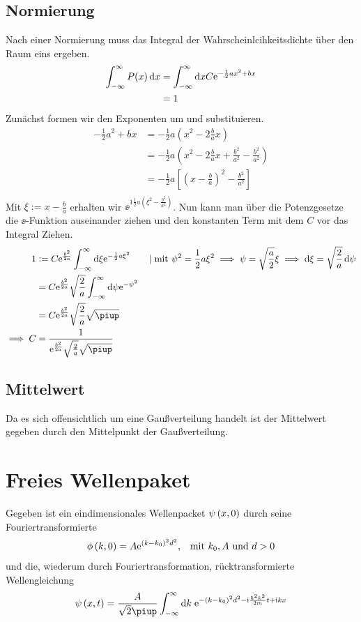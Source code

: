 \subsection{Normierung}
Nach einer Normierung muss das Integral der Wahrscheinlcihkeitsdichte über den Raum eins ergeben.
\begin{align*}
    \int^\infty_{-\infty} P(x)\dif x &= \int^\infty_{-\infty}\dif xC\ee^{-\frac 12ax^2+bx} \\
                                     &= 1 \\
\end{align*}
Zunächst formen wir den Exponenten um und substituieren.
\begin{align*}
    -\frac 12a^2+bx &= -\frac 12a(x^2-2\frac bax) \\
                    &= -\frac 12a(x^2-2\frac bax+\frac{b^2}{a^2}-\frac{b^2}{a^2}) \\
                    &= -\frac 12a[(x-\frac ba)^2-\frac{b^2}{a^2}] \\
\end{align*}
Mit $\xi := x-\frac ba$ erhalten wir $\ee^{1\frac 12 a(\xi^2-\frac{b^2}{a^2})}$.
Nun kann man über die Potenzgesetze die $\ee$-Funktion auseinander ziehen und den konstanten Term mit dem $C$ vor das Integral Ziehen.
\begin{align*}
    1&:= C\ee^{\frac{b^2}{2a}}\int^\infty_{-\infty}\dif\xi\ee^{-\frac 12a\xi^2} \qquad|\text{ mit }\psi^2 = \frac 12a\xi^2 \implies \psi=\sqrt{\frac a2}\xi \implies \dif\xi=\sqrt{\frac 2a}\dif \psi\\ 
     &= C\ee^{\frac{b^2}{2a}}\sqrt{\frac 2a}\int^\infty_{-\infty}\dif\psi\ee^{-\psi^2} \\
     &= C\ee^{\frac{b^2}{2a}}\sqrt{\frac 2a}\sqrt{\piup} \\
     \implies C &= \frac{1}{\ee^{\frac{b^2}{2a}}\sqrt{\frac 2a}\sqrt{\piup}} \\
\end{align*}

\subsection{Mittelwert}
Da es sich offensichtlich um eine Gaußverteilung handelt ist der Mittelwert gegeben durch den Mittelpunkt der Gaußverteilung.


\section{Freies Wellenpaket}
Gegeben ist ein eindimensionales Wellenpacket $\psi\del{x,0}$ durch seine Fouriertransformierte
\begin{align*}
	\phi\del{k,0}=A\ee^{\del{k-k_0}^2d^2}, &&\text{mit }k_0,A\text{ und }d>0
\end{align*}
und die, wiederum durch Fouriertransformation, rücktransformierte Wellengleichung
\begin{align*}
	\psi\del{x,t}=\frac{A}{\sqrt{2}\piup}\int_{-\infty}^{\infty}\dif k\;\ee^{-\del{k-k_0}^2d^2-\ii\frac{\hbar^2k^2}{2m}t+\ii kx}
\end{align*}

